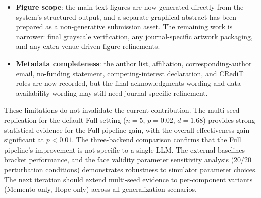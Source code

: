 \begin{itemize}
\item \textbf{Figure scope}: the main-text figures are now generated directly from the system's structured output, and a separate graphical abstract has been prepared as a non-generative submission asset. The remaining work is narrower: final grayscale verification, any journal-specific artwork packaging, and any extra venue-driven figure refinements.
\item \textbf{Metadata completeness}: the author list, affiliation, corresponding-author email, no-funding statement, competing-interest declaration, and CRediT roles are now recorded, but the final acknowledgments wording and data-availability wording may still need journal-specific refinement.

\end{itemize}

These limitations do not invalidate the current contribution. The multi-seed replication for the default Full setting ($n=5$, $p=0.02$, $d=1.68$) provides strong statistical evidence for the Full-pipeline gain, with the overall-effectiveness gain significant at $p<0.01$. The three-backend comparison confirms that the Full pipeline's improvement is not specific to a single LLM. The external baselines bracket performance, and the face validity parameter sensitivity analysis (20/20 perturbation conditions) demonstrates robustness to simulator parameter choices. The next iteration should extend multi-seed evidence to per-component variants (Memento-only, Hope-only) across all generalization scenarios.
